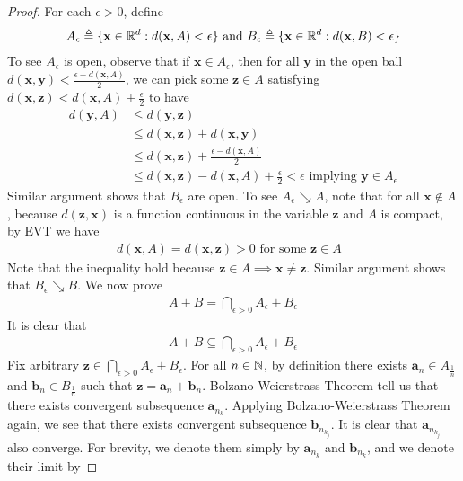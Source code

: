 \documentclass{report}
\begin{document}
\begin{proof}
For each $\epsilon >0$, define 
\begin{align*}
A_{\epsilon }\triangleq \{ \textbf{x}\in\mathbb{R}^d: d(\textbf{x},A)<\epsilon  \}\text{ and }B_{\epsilon }\triangleq \{ \textbf{x}\in\mathbb{R}^d: d(\textbf{x},B)<\epsilon  \}
\end{align*}
 To see $A_\epsilon $ is open, observe that if $\textbf{x}\in A_{\epsilon }$, then for all $\textbf{y}$ in the open ball $d(\textbf{x},\textbf{y})<\frac{\epsilon -d(\textbf{x},A)}{2}$, we can pick some $\textbf{z} \in A$ satisfying $d(\textbf{x},\textbf{z})< d(\textbf{x},A) + \frac{\epsilon}{2}$ to have
\begin{align*}
  d(\textbf{y},A)&\leq d(\textbf{y},\textbf{z})\\
  &\leq d(\textbf{x},\textbf{z})+d(\textbf{x},\textbf{y})\\
  &\leq d(\textbf{x},\textbf{z})+ \frac{\epsilon -d(\textbf{x},A)}{2}\\
  &\leq d(\textbf{x},\textbf{z})-d(\textbf{x},A)+ \frac{\epsilon }{2}<\epsilon \text{ implying }\textbf{y} \in A_\epsilon 
\end{align*}
Similar argument shows that $B_{\epsilon }$ are open. To see $A_\epsilon \searrow A$, note that for all $\textbf{x}\not\in A$, because $d(\textbf{z},\textbf{x})$ is a function continuous in the variable $\textbf{z}$ and $A$ is compact, by EVT we have 
 \begin{align*}
d(\textbf{x},A)=d(\textbf{x},\textbf{z})>0\text{ for some $\textbf{z}\in A$ }
\end{align*}
Note that the inequality hold because $\textbf{z}\in A \implies \textbf{x}\neq \textbf{z} $. Similar argument shows that $B_\epsilon \searrow B$. We now prove 
\begin{align}
\label{A+B}
A+B=\bigcap_{\epsilon >0}A_\epsilon +B_\epsilon  
\end{align}
It is clear that 
\begin{align}
\label{a+b}
A+B\subseteq \bigcap_{\epsilon >0}A_\epsilon +B_\epsilon 
\end{align}
Fix arbitrary $\textbf{z}\in \bigcap_{\epsilon >0}A_\epsilon +B_\epsilon $. For all $n\in\mathbb{N}$, by definition there exists $\textbf{a}_n \in A_{\frac{1}{n}} $ and $\textbf{b}_n \in B_{\frac{1}{n}} $ such that $\textbf{z}=\textbf{a}_n+\textbf{b}_n$. Bolzano-Weierstrass Theorem tell us that there exists convergent subsequence $\textbf{a}_{n_k}$. Applying Bolzano-Weierstrass Theorem again, we see that there exists convergent subsequence $\textbf{b}_{n_{k_j}}$. It is clear that $\textbf{a}_{n_{k_j}}$ also converge. For brevity, we denote them simply by $\textbf{a}_{n_k}$ and $\textbf{b}_{n_k}$, and we denote their limit by 

\end{proof}
\end{document}
